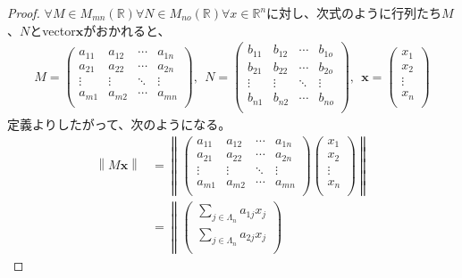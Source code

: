 \documentclass[dvipdfmx]{jsarticle}
\begin{document}
\begin{proof}
$\forall M \in M_{mn}\left( \mathbb{R} \right)\forall N \in M_{no}\left( \mathbb{R} \right)\forall x \in \mathbb{R}^{n}$に対し、次式のように行列たち$M$、$N$とvector$\mathbf{x}$がおかれると、
\begin{align*}
M = \begin{pmatrix}
a_{11} & a_{12} & \cdots & a_{1n} \\
a_{21} & a_{22} & \cdots & a_{2n} \\
 \vdots & \vdots & \ddots & \vdots \\
a_{m1} & a_{m2} & \cdots & a_{mn} \\
\end{pmatrix},\ \ N = \begin{pmatrix}
b_{11} & b_{12} & \cdots & b_{1o} \\
b_{21} & b_{22} & \cdots & b_{2o} \\
 \vdots & \vdots & \ddots & \vdots \\
b_{n1} & b_{n2} & \cdots & b_{no} \\
\end{pmatrix},\ \ \mathbf{x} = \begin{pmatrix}
x_{1} \\
x_{2} \\
 \vdots \\
x_{n} \\
\end{pmatrix}
\end{align*}
定義よりしたがって、次のようになる。
\begin{align*}
\left\| M\mathbf{x} \right\| &= \left\| \begin{pmatrix}
a_{11} & a_{12} & \cdots & a_{1n} \\
a_{21} & a_{22} & \cdots & a_{2n} \\
 \vdots & \vdots & \ddots & \vdots \\
a_{m1} & a_{m2} & \cdots & a_{mn} \\
\end{pmatrix}\begin{pmatrix}
x_{1} \\
x_{2} \\
 \vdots \\
x_{n} \\
\end{pmatrix} \right\|\\
&= \left\| \begin{pmatrix}
\sum_{j \in \varLambda_{n}} {a_{1j}x_{j}} \\
\sum_{j \in \varLambda_{n}} {a_{2j}x_{j}} \\

\end{pmatrix}
\end{align*}
\end{proof}
\end{document}
